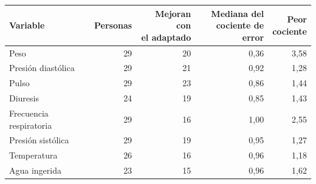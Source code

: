 \begin{tabular}{lrrrr}\toprule
 Variable & Personas & \makecell{Mejoran con\\el adaptado} & \makecell{Mediana del\\cociente de error} & \makecell{Peor\\cociente} \\
\midrule
Peso & 29 & 20 & 0,36 & 3,58 \\
Presión diastólica & 29 & 21 & 0,92 & 1,28 \\
Pulso & 29 & 23 & 0,86 & 1,44 \\
Diuresis & 24 & 19 & 0,85 & 1,43 \\
Frecuencia respiratoria & 29 & 16 & 1,00 & 2,55 \\
Presión sistólica & 29 & 19 & 0,95 & 1,27 \\
Temperatura & 26 & 16 & 0,96 & 1,18 \\
Agua ingerida & 23 & 15 & 0,96 & 1,62 \\
\bottomrule\end{tabular}
